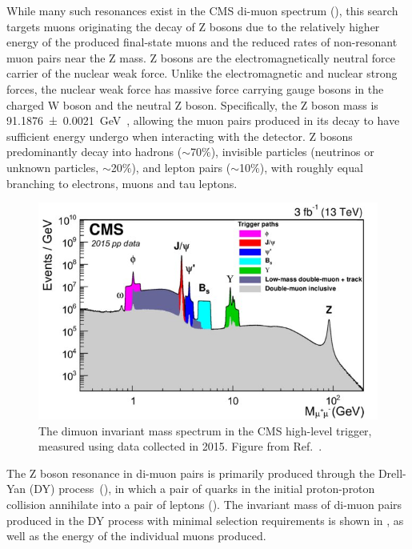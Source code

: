 While many such resonances exist in the CMS di-muon spectrum (), this search targets muons originating the decay of Z bosons due to the relatively higher energy of the produced final-state muons and the reduced rates of non-resonant muon pairs near the Z mass.
Z bosons are the electromagnetically neutral force carrier of the nuclear weak force.
Unlike the electromagnetic and nuclear strong forces, the nuclear weak force has massive force carrying gauge bosons in the charged W boson and the neutral Z boson.
Specifically, the Z boson mass is \SI{91.1876\pm0.0021}{\giga\eV}~\cite{pdg}, allowing the muon pairs produced in its decay to have sufficient energy undergo \dbrem when interacting with the detector. 
Z bosons predominantly decay into hadrons ($\sim$70$\%$), invisible particles (neutrinos or unknown particles, $\sim$20$\%$), and lepton pairs ($\sim$10$\%$), with roughly equal branching to electrons, muons and tau leptons.

\begin{figure}[ht]
	\centering
	\includegraphics[width=\textwidth]{figures/cms_diMuonSpectrum.jpg}
	\caption[Inclusive dimuon spectrum in CMS]{The dimuon invariant mass spectrum in the CMS high-level trigger, measured using data collected in 2015. Figure from Ref.~\cite{cmsMuonPerformance}.}
	\label{fig:diMuonSpectrum}
\end{figure}

The Z boson resonance in di-muon pairs is primarily produced through the Drell-Yan (DY) process~(\cite{origDYPaper,DYSummary}), in which a pair of quarks in the initial proton-proton collision annihilate into a pair of leptons ().
The invariant mass of di-muon pairs produced in the DY process with minimal selection requirements is shown in , as well as the energy of the individual muons produced. 

